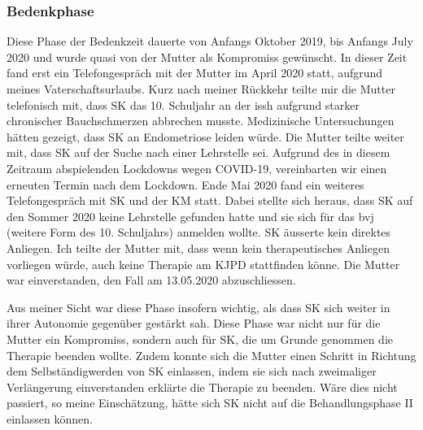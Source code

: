 \subsubsection{Bedenkphase}
Diese Phase der Bedenkzeit dauerte von Anfangs Oktober 2019, bis Anfangs July 2020 und wurde quasi von der Mutter als Kompromiss gewünscht. In dieser Zeit fand erst ein Telefongespräch mit der Mutter im April 2020 statt, aufgrund meines Vaterschaftsurlaubs. Kurz nach meiner Rückkehr teilte mir die Mutter telefonisch mit, dass SK das 10. Schuljahr an der \ac{issh} aufgrund starker chronischer Bauchschmerzen abbrechen musste. Medizinische Untersuchungen hätten gezeigt, dass SK an Endometriose leiden würde. Die Mutter teilte weiter mit, dass SK auf der Suche nach einer Lehrstelle sei. Aufgrund des in diesem Zeitraum abspielenden Lockdowns wegen COVID-19, vereinbarten wir einen erneuten Termin nach dem Lockdown. Ende Mai 2020 fand ein weiteres Telefongespräch mit SK und der KM statt. Dabei stellte sich heraus, dass SK auf den Sommer 2020 keine Lehrstelle gefunden hatte und sie sich für das \ac{bvj} (weitere Form des 10. Schuljahrs) anmelden wollte. SK äusserte kein direktes Anliegen. Ich teilte der Mutter mit, dass wenn kein therapeutisches Anliegen vorliegen würde, auch keine Therapie am KJPD stattfinden könne. Die Mutter war einverstanden, den Fall am 13.05.2020 abzuschliessen.

Aus meiner Sicht war diese Phase insofern wichtig, als dass SK sich weiter in ihrer Autonomie gegenüber gestärkt sah. Diese Phase war nicht nur für die Mutter ein Kompromiss, sondern auch für SK, die um Grunde genommen die Therapie beenden wollte. Zudem konnte sich die Mutter einen Schritt in Richtung dem Selbständigwerden von SK einlassen, indem sie sich nach zweimaliger Verlängerung einverstanden erklärte die Therapie zu beenden. Wäre dies nicht passiert, so meine Einschätzung, hätte sich SK nicht auf die Behandlungsphase II einlassen können. 


